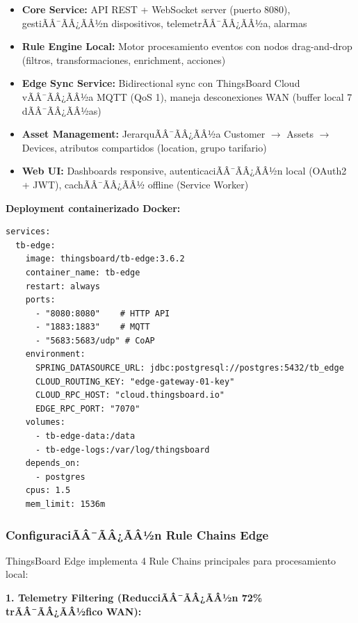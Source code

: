 \begin{itemize}
    \item \textbf{Core Service:} API REST + WebSocket server (puerto 8080), gestiÃÂ¯ÃÂ¿ÃÂ½n dispositivos, telemetrÃÂ¯ÃÂ¿ÃÂ½a, alarmas
    \item \textbf{Rule Engine Local:} Motor procesamiento eventos con nodos drag-and-drop (filtros, transformaciones, enrichment, acciones)
    \item \textbf{Edge Sync Service:} Bidirectional sync con ThingsBoard Cloud vÃÂ¯ÃÂ¿ÃÂ½a MQTT (QoS 1), maneja desconexiones WAN (buffer local 7 dÃÂ¯ÃÂ¿ÃÂ½as)
    \item \textbf{Asset Management:} JerarquÃÂ¯ÃÂ¿ÃÂ½a Customer $\rightarrow$ Assets $\rightarrow$ Devices, atributos compartidos (location, grupo tarifario)
    \item \textbf{Web UI:} Dashboards responsive, autenticaciÃÂ¯ÃÂ¿ÃÂ½n local (OAuth2 + JWT), cachÃÂ¯ÃÂ¿ÃÂ½ offline (Service Worker)
\end{itemize}

\textbf{Deployment containerizado Docker:}

\begin{verbatim}
services:
  tb-edge:
    image: thingsboard/tb-edge:3.6.2
    container_name: tb-edge
    restart: always
    ports:
      - "8080:8080"    # HTTP API
      - "1883:1883"    # MQTT
      - "5683:5683/udp" # CoAP
    environment:
      SPRING_DATASOURCE_URL: jdbc:postgresql://postgres:5432/tb_edge
      CLOUD_ROUTING_KEY: "edge-gateway-01-key"
      CLOUD_RPC_HOST: "cloud.thingsboard.io"
      EDGE_RPC_PORT: "7070"
    volumes:
      - tb-edge-data:/data
      - tb-edge-logs:/var/log/thingsboard
    depends_on:
      - postgres
    cpus: 1.5
    mem_limit: 1536m
\end{verbatim}

\subsubsection{ConfiguraciÃÂ¯ÃÂ¿ÃÂ½n Rule Chains Edge}

ThingsBoard Edge implementa 4 Rule Chains principales para procesamiento local:

\textbf{1. Telemetry Filtering (ReducciÃÂ¯ÃÂ¿ÃÂ½n 72\% trÃÂ¯ÃÂ¿ÃÂ½fico WAN):}


